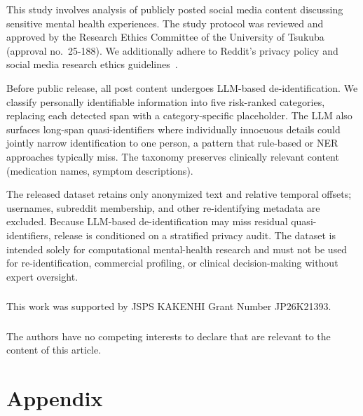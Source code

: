 \documentclass[runningheads]{llncs}
\begin{document}
This study involves analysis of publicly posted social media content discussing sensitive mental health experiences. The study protocol was reviewed and approved by the Research Ethics Committee of the University of Tsukuba (approval no.~25-188). We additionally adhere to Reddit's privacy policy and social media research ethics guidelines~\cite{harrigian2021state}.

Before public release, all post content undergoes LLM-based de-identification. We classify personally identifiable information into five risk-ranked categories, replacing each detected span with a category-specific placeholder. The LLM also surfaces long-span quasi-identifiers where individually innocuous details could jointly narrow identification to one person, a pattern that rule-based or NER approaches typically miss. The taxonomy preserves clinically relevant content (medication names, symptom descriptions).

 The released dataset retains only anonymized text and relative temporal offsets; usernames, subreddit membership, and other re-identifying metadata are excluded. Because LLM-based de-identification may miss residual quasi-identifiers, release is conditioned on a stratified privacy audit. The dataset is intended solely for computational mental-health research and must not be used for re-identification, commercial profiling, or clinical decision-making without expert oversight.

\begin{credits}
\subsubsection{\ackname}
This work was supported by JSPS KAKENHI Grant Number JP26K21393.

\subsubsection{\discintname}
The authors have no competing interests to declare that are relevant to the content of this article.
\end{credits}

\section*{Appendix}
\end{document}
